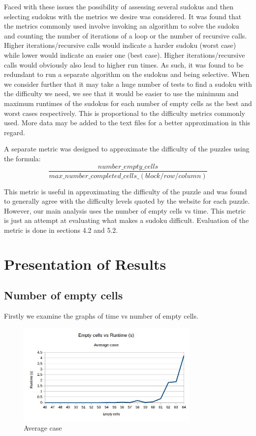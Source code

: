 \documentclass{article}
\begin{document}
Faced with these issues the possibility of assessing several sudokus and then selecting sudokus with the metrics we desire was considered. It was found that the metrics commonly used involve invoking an algorithm to solve the sudoku and counting the number of iterations of a loop or the number of recursive calls. Higher iterations/recursive calls would indicate a harder sudoku (worst case) while lower would indicate an easier one (best case). Higher iterations/recursive calls would obviously also lead to higher run times. As such, it was found to be redundant to run a separate algorithm on the sudokus and being selective. When we consider further that it may take a huge number of tests to find a sudoku with the difficulty we need, we see that it would be easier to use the minimum and maximum runtimes of the sudokus for each number of empty cells as the best and worst cases respectively. This is proportional to the difficulty metrics commonly used. More data may be added to the text files for a better approximation in this regard.

A separate metric was designed to approximate the difficulty of the puzzles using the formula: \[\frac{number\_empty\_cells}{max\_number\_completed\_cells\_(block/row/column)}\]

This metric is useful in approximating the difficulty of the puzzle and was found to generally agree with the difficulty levels quoted by the website for each puzzle. However, our main analysis uses the number of empty cells vs time. This metric is just an attempt at evaluating what makes a sudoku difficult. Evaluation of the metric is done in sections 4.2 and 5.2.

\newpage

\section{Presentation of Results}
\subsection{Number of empty cells}
Firstly we examine the graphs of time vs number of empty cells.

\begin{figure}[H]
	\includegraphics[width=0.9\linewidth, height=5cm]{graphs_outputs/EmptycellsVSTimeAverage.jpg}
	\caption{Average case}
\end{figure}
\end{document}
